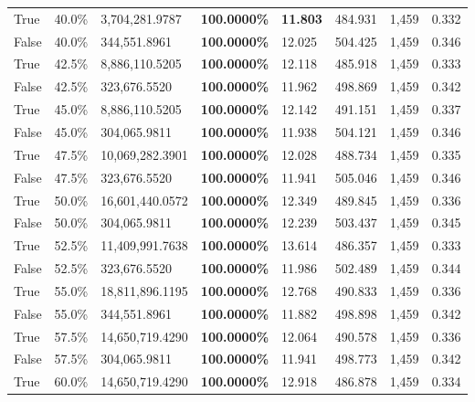 \begin{table}[H]
\begin{tabular}{lllrllll}
\cline{1-8}
True & 40.0\% & 3,704,281.9787 & \bfseries \color{red} 100.0000\% & \bfseries \color{red} 11.803 & 484.931 & 1,459 & 0.332 \\
\cline{1-8}
False & 40.0\% & 344,551.8961 & \bfseries \color{red} 100.0000\% & 12.025 & 504.425 & 1,459 & 0.346 \\
\cline{1-8}
True & 42.5\% & 8,886,110.5205 & \bfseries \color{red} 100.0000\% & 12.118 & 485.918 & 1,459 & 0.333 \\
\cline{1-8}
False & 42.5\% & 323,676.5520 & \bfseries \color{red} 100.0000\% & 11.962 & 498.869 & 1,459 & 0.342 \\
\cline{1-8}
True & 45.0\% & 8,886,110.5205 & \bfseries \color{red} 100.0000\% & 12.142 & 491.151 & 1,459 & 0.337 \\
\cline{1-8}
False & 45.0\% & \color{red} 304,065.9811 & \bfseries \color{red} 100.0000\% & 11.938 & 504.121 & 1,459 & 0.346 \\
\cline{1-8}
True & 47.5\% & 10,069,282.3901 & \bfseries \color{red} 100.0000\% & 12.028 & 488.734 & 1,459 & 0.335 \\
\cline{1-8}
False & 47.5\% & 323,676.5520 & \bfseries \color{red} 100.0000\% & 11.941 & 505.046 & 1,459 & 0.346 \\
\cline{1-8}
True & 50.0\% & 16,601,440.0572 & \bfseries \color{red} 100.0000\% & 12.349 & 489.845 & 1,459 & 0.336 \\
\cline{1-8}
False & 50.0\% & \color{red} 304,065.9811 & \bfseries \color{red} 100.0000\% & 12.239 & 503.437 & 1,459 & 0.345 \\
\cline{1-8}
True & 52.5\% & 11,409,991.7638 & \bfseries \color{red} 100.0000\% & 13.614 & 486.357 & 1,459 & 0.333 \\
\cline{1-8}
False & 52.5\% & 323,676.5520 & \bfseries \color{red} 100.0000\% & 11.986 & 502.489 & 1,459 & 0.344 \\
\cline{1-8}
True & 55.0\% & 18,811,896.1195 & \bfseries \color{red} 100.0000\% & 12.768 & 490.833 & 1,459 & 0.336 \\
\cline{1-8}
False & 55.0\% & 344,551.8961 & \bfseries \color{red} 100.0000\% & 11.882 & 498.898 & 1,459 & 0.342 \\
\cline{1-8}
True & 57.5\% & 14,650,719.4290 & \bfseries \color{red} 100.0000\% & 12.064 & 490.578 & 1,459 & 0.336 \\
\cline{1-8}
False & 57.5\% & \color{red} 304,065.9811 & \bfseries \color{red} 100.0000\% & 11.941 & 498.773 & 1,459 & 0.342 \\
\cline{1-8}
True & 60.0\% & 14,650,719.4290 & \bfseries \color{red} 100.0000\% & 12.918 & 486.878 & 1,459 & 0.334 \\

\end{tabular}
\end{table}
